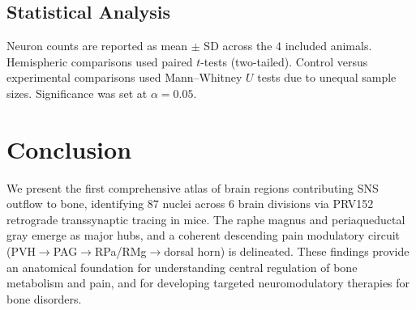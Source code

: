 \documentclass[11pt]{article}
\begin{document}
\subsection{Statistical Analysis}
Neuron counts are reported as mean $\pm$ SD across the 4 included animals. Hemispheric comparisons used paired $t$-tests (two-tailed). Control versus experimental comparisons used Mann--Whitney $U$ tests due to unequal sample sizes. Significance was set at $\alpha = 0.05$.

\section{Conclusion}

We present the first comprehensive atlas of brain regions contributing SNS outflow to bone, identifying 87 nuclei across 6 brain divisions via PRV152 retrograde transsynaptic tracing in mice. The raphe magnus and periaqueductal gray emerge as major hubs, and a coherent descending pain modulatory circuit (PVH$\to$PAG$\to$RPa/RMg$\to$dorsal horn) is delineated. These findings provide an anatomical foundation for understanding central regulation of bone metabolism and pain, and for developing targeted neuromodulatory therapies for bone disorders.



\end{document}
